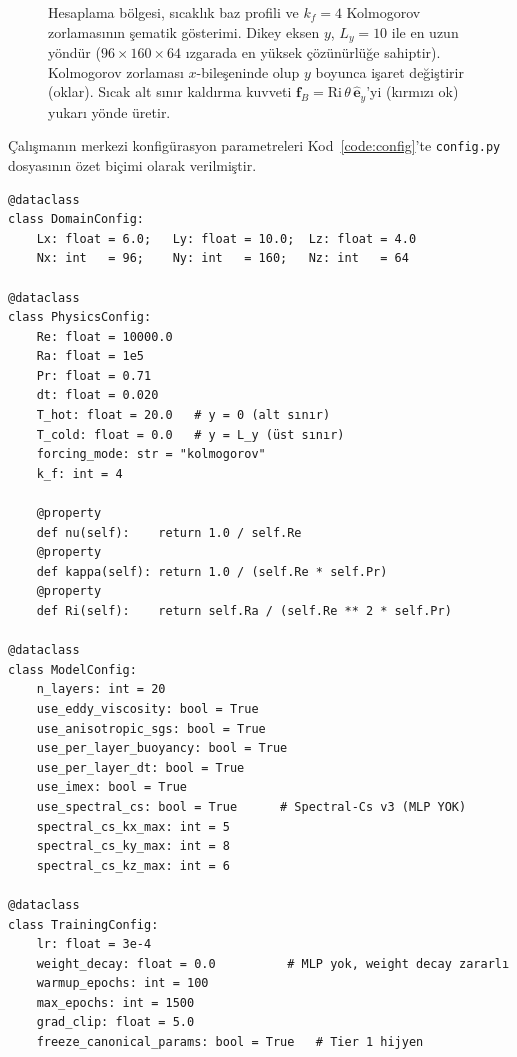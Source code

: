 \begin{figure}[H]
\caption{Hesaplama bölgesi, sıcaklık baz profili ve $k_{f}=4$ Kolmogorov zorlamasının şematik gösterimi. Dikey eksen $y$, $L_{y}=10$ ile en uzun yöndür ($96\times 160\times 64$ ızgarada en yüksek çözünürlüğe sahiptir). Kolmogorov zorlaması $x$-bileşeninde olup $y$ boyunca işaret değiştirir (oklar). Sıcak alt sınır kaldırma kuvveti $\mathbf{f}_{B}=\mathrm{Ri}\,\theta\,\hat{\mathbf{e}}_{y}$'yi (kırmızı ok) yukarı yönde üretir.}
\label{fig:domain_schema}
\end{figure}

Çalışmanın merkezi konfigürasyon parametreleri Kod~\ref{code:config}'te \texttt{config.py} dosyasının özet biçimi olarak verilmiştir.

\begin{lstlisting}[caption={Konfigürasyon dataclass'ları (özet). Tam dosya: \texttt{config.py}.}, label={code:config}]
@dataclass
class DomainConfig:
    Lx: float = 6.0;   Ly: float = 10.0;  Lz: float = 4.0
    Nx: int   = 96;    Ny: int   = 160;   Nz: int   = 64

@dataclass
class PhysicsConfig:
    Re: float = 10000.0
    Ra: float = 1e5
    Pr: float = 0.71
    dt: float = 0.020
    T_hot: float = 20.0   # y = 0 (alt sınır)
    T_cold: float = 0.0   # y = L_y (üst sınır)
    forcing_mode: str = "kolmogorov"
    k_f: int = 4

    @property
    def nu(self):    return 1.0 / self.Re
    @property
    def kappa(self): return 1.0 / (self.Re * self.Pr)
    @property
    def Ri(self):    return self.Ra / (self.Re ** 2 * self.Pr)

@dataclass
class ModelConfig:
    n_layers: int = 20
    use_eddy_viscosity: bool = True
    use_anisotropic_sgs: bool = True
    use_per_layer_buoyancy: bool = True
    use_per_layer_dt: bool = True
    use_imex: bool = True
    use_spectral_cs: bool = True      # Spectral-Cs v3 (MLP YOK)
    spectral_cs_kx_max: int = 5
    spectral_cs_ky_max: int = 8
    spectral_cs_kz_max: int = 6

@dataclass
class TrainingConfig:
    lr: float = 3e-4
    weight_decay: float = 0.0          # MLP yok, weight decay zararlı
    warmup_epochs: int = 100
    max_epochs: int = 1500
    grad_clip: float = 5.0
    freeze_canonical_params: bool = True   # Tier 1 hijyen
\end{lstlisting}

